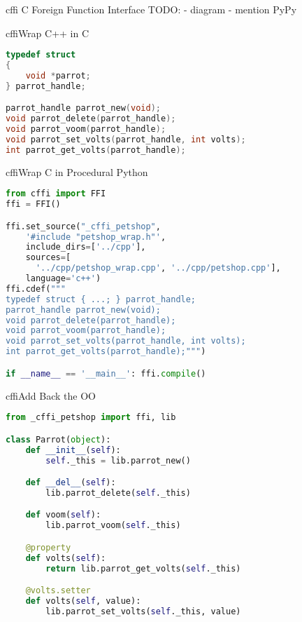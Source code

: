 \documentclass{beamer}
\begin{document}
\begin{frame}{cffi}
  C Foreign Function Interface
  TODO:
  - diagram
  - mention PyPy
\end{frame}

\begin{frame}[fragile=singleslide]{cffi}{Wrap C++ in C}
  \begin{lstlisting}[language=c]
typedef struct
{
    void *parrot;
} parrot_handle;

parrot_handle parrot_new(void);
void parrot_delete(parrot_handle);
void parrot_voom(parrot_handle);
void parrot_set_volts(parrot_handle, int volts);
int parrot_get_volts(parrot_handle);
  \end{lstlisting}
\end{frame}

\begin{frame}[fragile=singleslide]{cffi}{Wrap C in Procedural Python}
  \begin{lstlisting}[language=python]
from cffi import FFI
ffi = FFI()

ffi.set_source("_cffi_petshop",
    '#include "petshop_wrap.h"',
    include_dirs=['../cpp'],
    sources=[
      '../cpp/petshop_wrap.cpp', '../cpp/petshop.cpp'],
    language='c++')
ffi.cdef("""
typedef struct { ...; } parrot_handle;
parrot_handle parrot_new(void);
void parrot_delete(parrot_handle);
void parrot_voom(parrot_handle);
void parrot_set_volts(parrot_handle, int volts);
int parrot_get_volts(parrot_handle);""")

if __name__ == '__main__': ffi.compile()
  \end{lstlisting}
\end{frame}

\begin{frame}[fragile=singleslide]{cffi}{Add Back the OO}
  \begin{lstlisting}[language=python]
from _cffi_petshop import ffi, lib

class Parrot(object):
    def __init__(self):
        self._this = lib.parrot_new()

    def __del__(self):
        lib.parrot_delete(self._this)

    def voom(self):
        lib.parrot_voom(self._this)

    @property
    def volts(self):
        return lib.parrot_get_volts(self._this)

    @volts.setter
    def volts(self, value):
        lib.parrot_set_volts(self._this, value)
  \end{lstlisting}
\end{frame}
\end{document}
